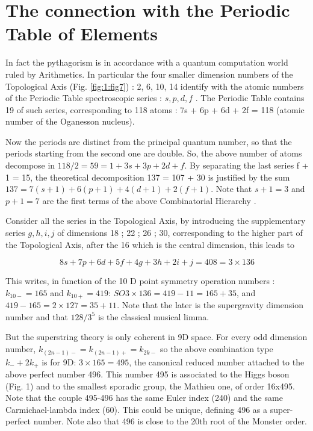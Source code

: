 \documentclass[a4paper,9pt]{article}
\begin{document}
\section{The connection with the Periodic Table of Elements}

     In fact the pythagorism is in accordance with a quantum computation world ruled by Arithmetics. In particular the four smaller dimension numbers of the Topological Axis (Fig. \ref{fig:1:fig7}) : 2, 6, 10, 14 identify with the atomic numbers of the Periodic Table spectroscopic series : $s, p, d, f$ . The Periodic Table contains 19 of such series, corresponding to 118 atoms : 7s + 6p + 6d + 2f = 118 (atomic number of the Oganesson nucleus). 
     

     Now the periods are distinct from the principal quantum number, so that the periods starting from the second one are double. So, the above number of atoms decompose in $118/2 = 59 = 1 + 3s + 3p + 2d + f$.  By separating the last series f + 1 = 15, the theoretical decomposition 137 = 107 + 30 is justified by the sum $137 = 7(s +1) + 6(p +1) + 4(d +1) + 2(f +1)$. Note that $s + 1 = 3$ and $p + 1 = 7$ are the first terms of the above Combinatorial Hierarchy\cite{Bastin} .



     Consider all the series in the Topological Axis, by introducing the supplementary series $g, h, i, j$ of dimensions 18 ; 22 ; 26 ; 30, corresponding to the higher part of the Topological Axis, after the 16 which is the central dimension, this leads to
     
     \begin{equation}
      8s + 7p + 6 d + 5f + 4g + 3h + 2i + j = 408 = 3 \times 136   
     \end{equation}
      
     
     This writes, in function of the 10 D point symmetry operation numbers :  $k_{10-} = 165$ and $k_{10+} = 419$: $SO3 \times 136 = 419 - 11 = 165 + 35$, and $419-165 = 2 \times 127 =  35 + 11$. Note that the later is the supergravity dimension number and that $128/3^5$ is the classical musical limma. 
     
     
     But the superstring theory is only coherent in 9D space. For every odd dimension number, $k_{(2n - 1)-} = k_{(2n - 1)+} = k_{2k-}$ so the above combination type $k_- + 2k_+$ is for 9D: $3 \times 165 = 495$, the canonical reduced number attached to the above perfect number 496. This number 495 is associated to the Higgs boson (Fig. 1) and to the smallest sporadic group, the Mathieu one, of order 16x495. Note that the couple 495-496 has the same Euler index (240) and the same Carmichael-lambda index (60). This could be unique, defining 496 as a super-perfect number. Note also that 496 is close to the 20th root of the Monster order.
 
\end{document}
